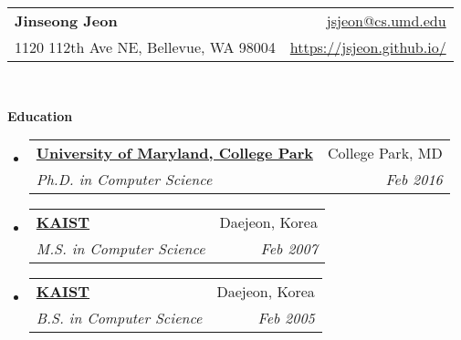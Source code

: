 \documentclass[letterpaper,11pt]{article}
\makeatletter
\newcommand{\resheading}[1]{{\large \colorbox{mygrey}{\begin{minipage}{\textwidth}{\textbf{#1 \vphantom{p\^{E}}}}\end{minipage}}}}
\newcommand{\ressubheading}[4]{
\begin{tabular*}{6.5in}{l@{\extracolsep{\fill}}r}
    \textbf{#1} & #2 \\
    \textit{#3} & \textit{#4} \\
\end{tabular*}\vspace{-6pt}}
\makeatother
\begin{document}
\newcommand{\mywebheader}{
\begin{tabular*}{7in}{l@{\extracolsep{\fill}}r}
  \textbf{{\LARGE Jinseong Jeon}}
& \href{mailto:jsjeon@cs.umd.edu}{jsjeon@cs.umd.edu}
\\
  {\small 1120 112th Ave NE, Bellevue, WA 98004}
& \href{https://jsjeon.github.io/}{\url{https://jsjeon.github.io/}}
\\
\end{tabular*}
\\
\vspace{0.1in}}

\mywebheader

\resheading{Education}
  \begin{itemize}
    \item
      \ressubheading{\href{https://www.cs.umd.edu}{University of Maryland, College Park}}{College Park, MD}{{Ph.D. in Computer Science}}{Feb 2016}
    \item
      \ressubheading{\href{https://cs.kaist.ac.kr}{KAIST}}{Daejeon, Korea}{{M.S. in Computer Science}}{Feb 2007}
\begin{comment}
Outstanding Master's Thesis Award from Dept. of Computer Science, KAIST
\end{comment}
    \item
      \ressubheading{\href{https://cs.kaist.ac.kr}{KAIST}}{Daejeon, Korea}{{B.S. in Computer Science}}{Feb 2005}
\begin{comment}
Graduated with High Honor (\emph{Magna Cum Laude})
\end{comment}
  \end{itemize} %
\end{document}
